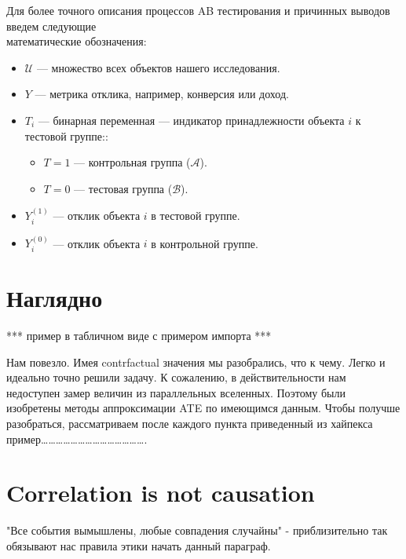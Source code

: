 \documentclass{article}
\begin{document}
        Для более точного описания процессов AB тестирования и причинных выводов введем следующие\\ математические обозначения:
        \begin{itemize}
            \item \( \mathcal{U} \) — множество всех объектов нашего исследования.
            \item \( Y \) — метрика отклика, например, конверсия или доход.
            \item \( T_i \) — бинарная переменная — индикатор принадлежности объекта \( i \) к тестовой группе::
            \begin{itemize}
                \item \( T = 1 \) — контрольная группа ($\mathcal{A}$).
                \item \( T = 0 \) — тестовая группа ($\mathcal{B}$).
            \end{itemize}
            \item \( Y_i^{(1)} \) — отклик объекта \( i \) в тестовой группе.
            \item \( Y_i^{(0)} \) — отклик объекта \( i \) в контрольной группе.
        \end{itemize}






    \section*{Наглядно}
        *** пример в табличном виде с примером импорта ***

        Нам повезло. Имея contrfactual значения мы разобрались, что к чему. Легко и идеально точно решили задачу. К сожалению, в действительности нам недоступен замер величин из параллельных вселенных. Поэтому были изобретены методы аппроксимации ATE по имеющимся данным.
                Чтобы получше разобраться, рассматриваем после каждого пункта приведенный из хайпекса пример…………………………………….





    \section*{Correlation is not causation}

        "Все события вымышлены, любые совпадения случайны" - приблизительно так обязывают нас правила этики начать данный параграф.
\end{document}
